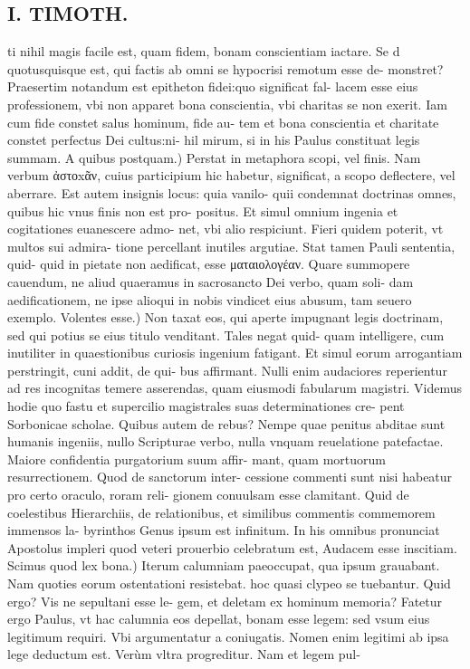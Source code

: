 \documentclass{article}
\begin{document}
\begin{pages}
\section*{I. TIMOTH. }
\marginpar{[ p.6 ]}\pstart ti nihil magis facile est, quam fidem, bonam conscientiam iactare. Se d quotusquisque est, qui factis ab omni se hypocrisi remotum esse de- monstret? Praesertim notandum est epitheton fidei:quo significat fal- lacem esse eius professionem, vbi non apparet bona conscientia, vbi charitas se non exerit. Iam cum fide constet salus hominum, fide au- tem et bona conscientia et charitate constet perfectus Dei cultus:ni- hil mirum, si in his Paulus constituat legis summam.  \pend\pstart A quibus postquam.) Perstat in metaphora scopi, vel finis. Nam verbum ἀστοxᾶν, cuius participium hic habetur, significat, a scopo deflectere, vel aberrare. Est autem insignis locus: quia vanilo- quii condemnat doctrinas omnes, quibus hic vnus finis non est pro- positus. Et simul omnium ingenia et cogitationes euanescere admo- net, vbi alio respiciunt. Fieri quidem poterit, vt multos sui admira- tione percellant inutiles argutiae. Stat tamen Pauli sententia, quid- quid in pietate non aedificat, esse ματαιολογέαν. Quare summopere cauendum, ne aliud quaeramus in sacrosancto Dei verbo, quam soli- dam aedificationem, ne ipse alioqui in nobis vindicet eius abusum, tam seuero exemplo.  \pend\pstart Volentes esse.) Non taxat eos, qui aperte impugnant legis doctrinam, sed qui potius se eius titulo venditant. Tales negat quid- quam intelligere, cum inutiliter in quaestionibus curiosis ingenium fatigant. Et simul eorum arrogantiam perstringit, cuni addit, de qui- bus affirmant. Nulli enim audaciores reperientur ad res incognitas temere asserendas, quam eiusmodi fabularum magistri. Videmus hodie quo fastu et supercilio magistrales suas determinationes cre- pent Sorbonicae scholae. Quibus autem de rebus? Nempe quae penitus abditae sunt humanis ingeniis, nullo Scripturae verbo, nulla vnquam reuelatione patefactae. Maiore confidentia purgatorium suum affir- mant, quam mortuorum resurrectionem. Quod de sanctorum inter- cessione commenti sunt nisi habeatur pro certo oraculo, roram reli- gionem conuulsam esse clamitant. Quid de coelestibus Hierarchiis, de relationibus, et similibus commentis commemorem immensos la- byrinthos Genus ipsum est infinitum. In his omnibus pronunciat Apostolus impleri quod veteri prouerbio celebratum est, Audacem esse inscitiam.  \pend\pstart Scimus quod lex bona.) Iterum calumniam paeoccupat, qua ipsum grauabant. Nam quoties eorum ostentationi resistebat. hoc quasi clypeo se tuebantur. Quid ergo? Vis ne sepultani esse le- gem, et deletam ex hominum memoria? Fatetur ergo Paulus, vt hac calumnia eos depellat, bonam esse legem: sed vsum eius legitimum requiri. Vbi argumentatur a coniugatis. Nomen enim legitimi ab ipsa lege deductum est. Verùm vltra progreditur. Nam et legem pul-  \pend

\end{pages}
\end{document}
